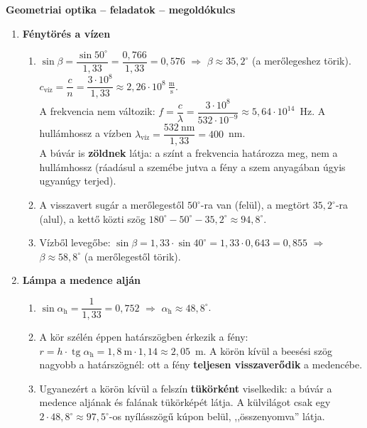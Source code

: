 \documentclass[11pt,a4paper]{article}
\begin{document}
\begin{center}
  {\Large\bfseries Geometriai optika -- feladatok -- megoldókulcs}
\end{center}

\begin{enumerate}
\item \textbf{Fénytörés a vízen}
  \begin{enumerate}
    \item $\sin\beta = \dfrac{\sin 50^\circ}{1{,}33} = \dfrac{0{,}766}{1{,}33} = 0{,}576$
      $\Rightarrow$ $\beta \approx 35{,}2^\circ$ (a merőlegeshez törik).\\
      $c_\text{víz} = \dfrac{c}{n} = \dfrac{3\cdot 10^8}{1{,}33} \approx
      2{,}26\cdot 10^8~\tfrac{\text{m}}{\text{s}}$.\\
      A frekvencia nem változik: $f = \dfrac{c}{\lambda} = \dfrac{3\cdot 10^8}{532\cdot 10^{-9}}
      \approx 5{,}64\cdot 10^{14}$~Hz. A hullámhossz a vízben
      $\lambda_\text{víz} = \dfrac{532~\text{nm}}{1{,}33} = 400$~nm.\\
      A búvár is \textbf{zöldnek} látja: a színt a frekvencia határozza meg, nem a hullámhossz
      (ráadásul a szemébe jutva a fény a szem anyagában úgyis ugyanúgy terjed).
    \item A visszavert sugár a merőlegestől $50^\circ$-ra van (felül), a megtört
      $35{,}2^\circ$-ra (alul), a kettő közti szög
      $180^\circ - 50^\circ - 35{,}2^\circ \approx 94{,}8^\circ$.
    \item Vízből levegőbe: $\sin\beta = 1{,}33\cdot\sin 40^\circ = 1{,}33\cdot 0{,}643 = 0{,}855$
      $\Rightarrow$ $\beta \approx 58{,}8^\circ$ (a merőlegestől törik).
  \end{enumerate}

\item \textbf{Lámpa a medence alján}
  \begin{enumerate}
    \item $\sin\alpha_\text{h} = \dfrac{1}{1{,}33} = 0{,}752$ $\Rightarrow$
      $\alpha_\text{h} \approx 48{,}8^\circ$.
    \item A kör szélén éppen határszögben érkezik a fény:
      $r = h\cdot\operatorname{tg}\alpha_\text{h} = 1{,}8~\text{m}\cdot 1{,}14 \approx 2{,}05$~m.
      A körön kívül a beesési szög nagyobb a határszögnél: ott a fény \textbf{teljesen
      visszaverődik} a medencébe.
    \item Ugyanezért a körön kívül a felszín \textbf{tükörként} viselkedik: a búvár a medence
      aljának és falának tükörképét látja. A külvilágot csak egy $2\cdot 48{,}8^\circ \approx
      97{,}5^\circ$-os nyílásszögű kúpon belül, ,,összenyomva'' látja.
  \end{enumerate}


\end{enumerate}
\end{document}
